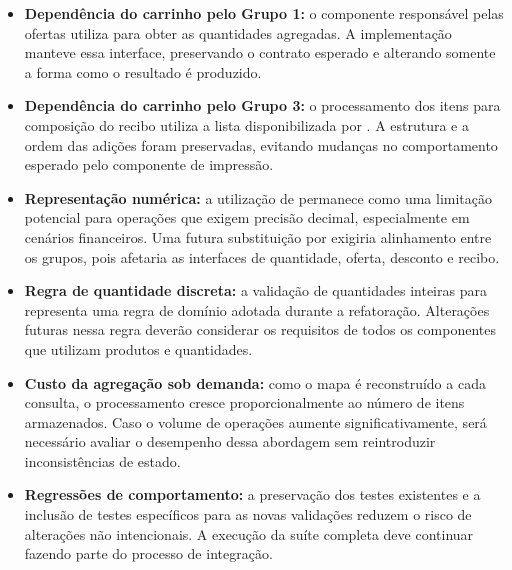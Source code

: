 \begin{itemize}

\item \textbf{Dependência do carrinho pelo Grupo 1:} o componente responsável pelas ofertas utiliza  para obter as quantidades agregadas. A implementação manteve essa interface, preservando o contrato esperado e alterando somente a forma como o resultado é produzido.

\item \textbf{Dependência do carrinho pelo Grupo 3:} o processamento dos itens para composição do recibo utiliza a lista disponibilizada por . A estrutura e a ordem das adições foram preservadas, evitando mudanças no comportamento esperado pelo componente de impressão.

\item \textbf{Representação numérica:} a utilização de  permanece como uma limitação potencial para operações que exigem precisão decimal, especialmente em cenários financeiros. Uma futura substituição por  exigiria alinhamento entre os grupos, pois afetaria as interfaces de quantidade, oferta, desconto e recibo.

\item \textbf{Regra de quantidade discreta:} a validação de quantidades inteiras para  representa uma regra de domínio adotada durante a refatoração. Alterações futuras nessa regra deverão considerar os requisitos de todos os componentes que utilizam produtos e quantidades.

\item \textbf{Custo da agregação sob demanda:} como o mapa é reconstruído a cada consulta, o processamento cresce proporcionalmente ao número de itens armazenados. Caso o volume de operações aumente significativamente, será necessário avaliar o desempenho dessa abordagem sem reintroduzir inconsistências de estado.

\item \textbf{Regressões de comportamento:} a preservação dos testes existentes e a inclusão de testes específicos para as novas validações reduzem o risco de alterações não intencionais. A execução da suíte completa deve continuar fazendo parte do processo de integração.

\end{itemize}

